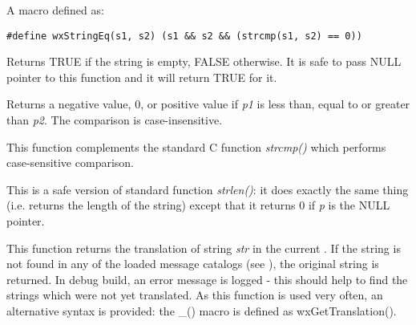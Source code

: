 \label{wxstringeq}


A macro defined as:

\begin{verbatim}
#define wxStringEq(s1, s2) (s1 && s2 && (strcmp(s1, s2) == 0))
\end{verbatim}

\label{isempty}


Returns TRUE if the string is empty, FALSE otherwise. It is safe to pass NULL
pointer to this function and it will return TRUE for it.

\label{stricmp}


Returns a negative value, 0, or positive value if {\it p1} is less than, equal
to or greater than {\it p2}. The comparison is case-insensitive.

This function complements the standard C function {\it strcmp()} which performs
case-sensitive comparison.

\label{strlen}


This is a safe version of standard function {\it strlen()}: it does exactly the
same thing (i.e. returns the length of the string) except that it returns 0 if 
{\it p} is the NULL pointer.

\label{wxgettranslation}


This function returns the translation of string {\it str} in the current 
. If the string is not found in any of the loaded
message catalogs (see ), the
original string is returned. In debug build, an error message is logged - this
should help to find the strings which were not yet translated. As this function
is used very often, an alternative syntax is provided: the \_() macro is
defined as wxGetTranslation().

\label{wxsnprintf}

